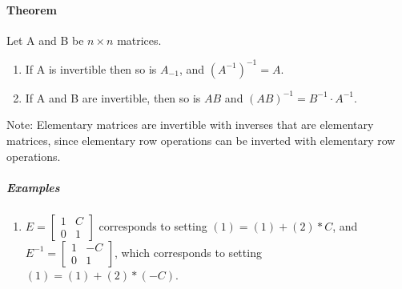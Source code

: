 \documentclass[10pt,letter]{article}
\begin{document}
\paragraph{Theorem}
Let A and B be $n\times n$ matrices. \begin{enumerate}
    \item If A is invertible then so is $A_{-1}$, and $(A^{-1})^{-1}=A$. 
    \item If A and B are invertible, then so is $AB$ and $(AB)^{-1}=B^{-1}\cdot A^{-1}$. 
\end{enumerate}
Note: Elementary matrices are invertible with inverses that are elementary matrices, since elementary row operations can be inverted with elementary row operations. \\ 
\subparagraph{Examples}
\begin{enumerate}
    \item $E=\begin{bmatrix}1&C\\0&1\end{bmatrix}$ corresponds to setting $(1)=(1)+(2)*C$, and $E^{-1}=\begin{bmatrix}1&-C\\0&1\end{bmatrix}$, which corresponds to setting $(1)=(1)+(2)*(-C)$. 
\end{enumerate}
\end{document}
